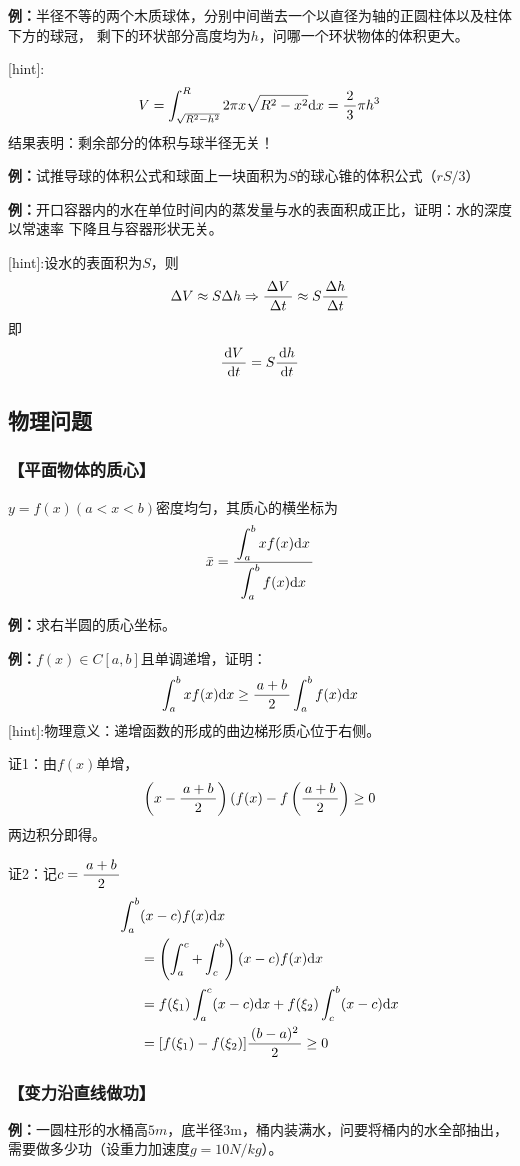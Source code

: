 {\bf 例：}半径不等的两个木质球体，分别中间凿去一个以直径为轴的正圆柱体以及柱体下方的球冠，
剩下的环状部分高度均为$h$，问哪一个环状物体的体积更大。

[hint]:
$$V=\displaystyle\int_{\sqrt{R^2-h^2}}^R2\pi x\sqrt{R^2-x^2}\mathrm{d} x=\displaystyle\frac{\,{2}\,}{\,{3}\,}\pi h^3$$
结果表明：剩余部分的体积与球半径无关！

{\bf 例：}试推导球的体积公式和球面上一块面积为$S$的球心锥的体积公式（$rS/3$）

{\bf 例：}开口容器内的水在单位时间内的蒸发量与水的表面积成正比，证明：水的深度以常速率
下降且与容器形状无关。

[hint]:设水的表面积为$S$，则
$$\Delta V\approx S\Delta h\Rightarrow
\displaystyle\frac{\,{\Delta V}\,}{\,{\Delta t}\,}\approx S\displaystyle\frac{\,{\Delta h}\,}{\,{\Delta t}\,}$$
即
$$\displaystyle\frac{\,{\mathrm{d} V}\,}{\,{\mathrm{d} t}\,}=S\displaystyle\frac{\,{\mathrm{d} h}\,}{\,{\mathrm{d} t}\,}$$

\subsection{物理问题}

\subsubsection{【平面物体的质心】}
$y=f(x)(a<x<b)$密度均匀，其质心的横坐标为
$$\bar{x}=\displaystyle\frac{\,{\displaystyle\int_a^bxf(x)\mathrm{d} x}\,}{\,{\displaystyle\int_a^bf(x)\mathrm{d} x}\,}$$

{\bf 例：}求右半圆的质心坐标。

{\bf 例：}$f(x)\in C[a,b]$且单调递增，证明：
$$\displaystyle\int_a^bxf(x)\mathrm{d} x\geq\displaystyle\frac{\,{a+b}\,}{\,{2}\,}\displaystyle\int_a^bf(x)\mathrm{d} x$$
[hint]:物理意义：递增函数的形成的曲边梯形质心位于右侧。

证1：由$f(x)$单增，
$$\left(x-\displaystyle\frac{\,{a+b}\,}{\,{2}\,}\right)\left(f(x\right)-f\left(
\displaystyle\frac{\,{a+b}\,}{\,{2}\,}\right)\geq0$$
两边积分即得。

证2：记$c=\displaystyle\frac{\,{a+b}\,}{\,{2}\,}$
\begin{align}
	\displaystyle\int_a^b&(x-c)f(x)\mathrm{d} x\notag\\
	&=\left(\displaystyle\int_a^c+\displaystyle\int_c^b\right)(x-c)f(x)\mathrm{d} x\notag\\
	&=f(\xi_1)\displaystyle\int_a^c(x-c)\mathrm{d} x+f(\xi_2)\displaystyle\int_c^b(x-c)\mathrm{d} x\notag\\
	&=[f(\xi_1)-f(\xi_2)]\displaystyle\frac{\,{(b-a)^2}\,}{\,{2}\,}\geq0
\end{align}

\subsubsection{【变力沿直线做功】}

{\bf 例：}一圆柱形的水桶高$5m$，底半径$3$m，桶内装满水，问要将桶内的水全部抽出，
需要做多少功（设重力加速度$g=10N/kg$）。

